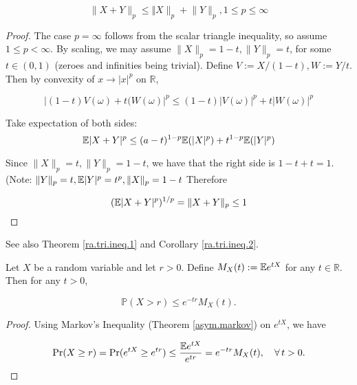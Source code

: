 \begin{itemize}
\begin{itemize}
\begin{theorem}
\[
\lVert X+Y\rVert_p \leq \Vert X\rVert_p + \lVert Y \rVert_p, 1 \leq p \leq \infty
\]

\begin{proof} The case \(p = \infty\) follows from the scalar triangle inequality, so assume \(1 \leq p < \infty\). By scaling, we may assume \(\lVert X \rVert_p = 1 - t, \lVert Y \rVert_p = t\), for some \(t \in (0,1)\) (zeroes and infinities being trivial). Define \(V:=X/(1-t), W:=Y/t\). Then by convexity of \(x \to |x|^p\) on \(\mathbb{R}\), 

\[
|(1-t)V(\omega) + t(W(\omega)|^p \leq (1-t)|V(\omega)|^p + t|W(\omega)|^p
\]

Take expectation of both sides:
\[
\mathbb{E}|X+Y|^p \leq (a-t)^{1-p}\mathbb{E}(|X|^p) + t^{1-p}\mathbb{E}(|Y|^p)
\]

Since \(\lVert X\rVert_p = t, \lVert Y \rVert_p=1-t\), we have that the right side is \(1 - t + t = 1\). (Note: \(\lVert Y\rVert_p = t, \mathbb{E}|Y|^p = t^p, \lVert X\rVert_p = 1-t\) Therefore

\[
(\mathbb{E}|X+Y|^p)^{1/p} = \lVert X+Y\rVert_p \leq 1
\]

\end{proof}

\begin{remark} See also Theorem \ref{ra.tri.ineq.1} and Corollary \ref{ra.tri.ineq.2}. \end{remark}

\end{theorem}
\end{itemize}

\end{itemize}

\begin{theorem}
Let $X$ be a random variable and let $r>0$.  Define $M_{X}(t):= \mathbb{E} e^{tX}$ for any $t\in\mathbb{R}$. Then for any $t>0$,

\[
\mathbb{P}(X>r)\leq e^{-tr}M_{X}(t).
\]

\end{theorem}

\begin{proof} Using Markov's Inequality (Theorem \ref{asym.markov}) on \(e^{tX}\), we have

\[
\Pr (X\geq r) = \Pr (e^{tX} \geq e^{t r}) \leq \frac{\E e^{tX}}{e^{t r}}  = e^{-tr}M_{X}(t), \ \ \ \forall\,t>0.
\]

\end{proof}

